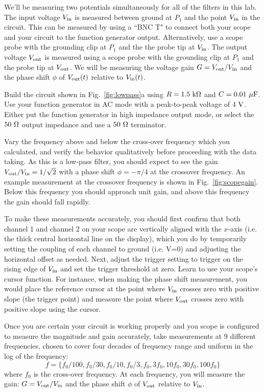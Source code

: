 We'll be measuring two potentials simultaneously for all of the filters in this lab.  The input voltage $V_{\rm in}$ is measured between ground at $P_1$ and the point $V_{\rm in}$ in the circuit.  This can be measured by using a ``BNC T" to connect both your scope and your circuit to the function generator output.  Alternatively, use a scope probe with the grounding clip at $P_1$ and the the probe tip at $V_{\rm in}$.  The output voltage $V_{\rm out}$ is measured using a scope probe with the grounding clip at $P_1$ and the probe tip at $V_{\rm out}$.  We will be measuring the voltage gain $G = V_{\rm out} / V_{\rm in}$ and the phase shift $\phi$ of $V_{\rm out}(t)$ relative to $V_{\rm in}(t)$. 

Build the circuit shown in Fig.~\ref{fig:lowpass}a using $R=1.5~\rm k \Omega$ and $C= 0.01~\rm \mu F$.   Use your function generator in AC mode with a peak-to-peak voltage of $4~\rm V$.   Either put the function generator in high impedance output mode, or select the $50~\rm \Omega$ output impedance and use a $50~\rm \Omega$ terminator.

Vary the frequency above and below the cross-over frequency which you calculated, and verify the behavior qualitatively before proceeding with the data taking.  As this is a low-pass filter, you should expect to see the gain $V_{\rm out}/V_{\rm in} = 1/\sqrt{2}$ with a phase shift $\phi = -\pi/4$ at the crossover frequency.  An example measurement at the crossover frequency is shown in Fig.~\ref{fig:scopegain}.  Below this frequency you should approach unit gain, and above this frequency the gain should fall rapidly.  

To make these measurements accurately, you should first confirm that both channel 1 and channel 2 on your scope are vertically aligned with the $x$-axis (i.e. the thick central horizontal line on the display), which you do by temporarily setting the coupling of each channel to ground (i.e. V=0) and adjusting the horizontal offset as needed.  Next, adjust the trigger setting to trigger on the rising edge of $V_{\rm in}$ and set the trigger threshold at zero.  Learn to use your scope's cursor function.  For instance, when making the phase shift measurement, you would place the reference cursor at the point where 
$V_{\rm in}$ crosses zero with positive slope (the trigger point) and measure the point where $V_{\rm out}$ crosses zero with positive slope using the cursor.

Once you are certain your circuit is working properly and you scope is configured to measure the magnitude and gain accurately, take measurements at 9 different frequencies, chosen to cover four decades of frequency range and uniform in the log of the frequency:
\begin{displaymath}
f=\{f_0/100, f_0/30, f_0/10, f_0/3,f_0, 3f_0, 10f_0, 30f_0, 100f_0\}
\end{displaymath}
where $f_0$ is the cross-over frequency.  At each frequency, you will measure the gain:  $G = V_{\rm out} / V_{\rm in}$ and the phase shift $\phi$ of $V_{\rm out}$ relative to $V_{\rm in}$.  

